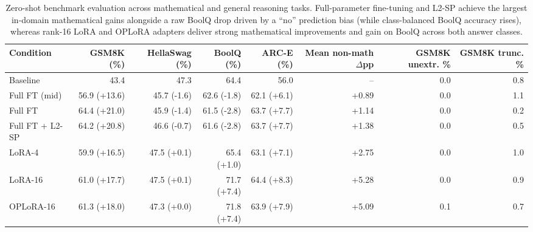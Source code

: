 \begin{table}[t]
\centering
\small
\caption{Zero-shot benchmark evaluation across mathematical and general reasoning tasks. Full-parameter fine-tuning and L2-SP achieve the largest in-domain mathematical gains alongside a raw BoolQ drop driven by a ``no'' prediction bias (while class-balanced BoolQ accuracy rises), whereas rank-16 LoRA and OPLoRA adapters deliver strong mathematical improvements and gain on BoolQ across both answer classes.}
\label{tab:t1-bench}
\begin{tabular}{lrrrrrrr}
\toprule
Condition & GSM8K (\%) & HellaSwag (\%) & BoolQ (\%) & ARC-E (\%) & Mean non-math $\Delta$pp & GSM8K unextr. \% & GSM8K trunc. \% \\
\midrule
Baseline & 43.4 & 47.3 & 64.4 & 56.0 & – & 0.0 & 0.8 \\
Full FT (mid) & 56.9 (+13.6) & 45.7 (-1.6) & 62.6 (-1.8) & 62.1 (+6.1) & +0.89 & 0.0 & 1.1 \\
Full FT & 64.4 (+21.0) & 45.9 (-1.4) & 61.5 (-2.8) & 63.7 (+7.7) & +1.14 & 0.0 & 0.2 \\
Full FT + L2-SP & 64.2 (+20.8) & 46.6 (-0.7) & 61.6 (-2.8) & 63.7 (+7.7) & +1.38 & 0.0 & 0.5 \\
LoRA-4 & 59.9 (+16.5) & 47.5 (+0.1) & 65.4 (+1.0) & 63.1 (+7.1) & +2.75 & 0.0 & 1.0 \\
LoRA-16 & 61.0 (+17.7) & 47.5 (+0.1) & 71.7 (+7.4) & 64.4 (+8.3) & +5.28 & 0.0 & 0.9 \\
OPLoRA-16 & 61.3 (+18.0) & 47.3 (+0.0) & 71.8 (+7.4) & 63.9 (+7.9) & +5.09 & 0.1 & 0.7 \\
\bottomrule
\end{tabular}
\end{table}
